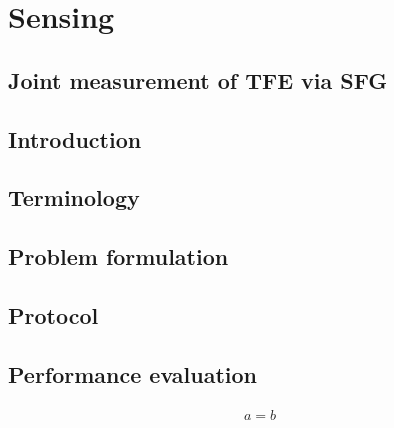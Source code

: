 \documentclass[../../note.tex]{subfiles}
\begin{document}
\chapter{Sensing}
\section{Joint measurement of TFE via SFG}
\section{Introduction}

\section{Terminology}

\section{Problem formulation}

\section{Protocol}

\section{Performance evaluation}

\begin{lemma}
    \begin{align}
        a=b
    \end{align}
\end{lemma}
\end{document}
